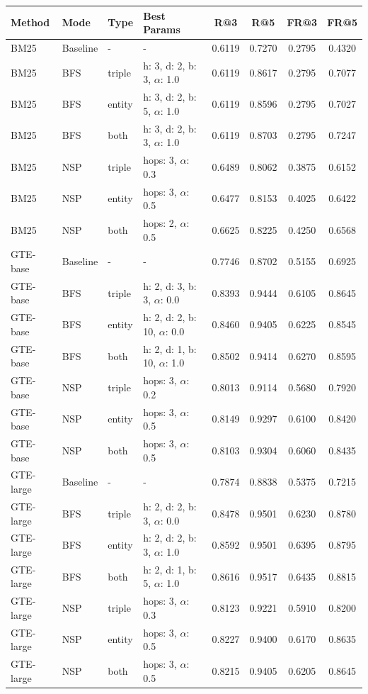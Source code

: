 \documentclass[11pt]{article}
\begin{document}
\begin{table}[t]
\centering
\footnotesize
\begin{tabular}{llllcccc}
\toprule
\textbf{Method} & \textbf{Mode} & \textbf{Type} & \textbf{Best Params} & \textbf{R@3} & \textbf{R@5} & \textbf{FR@3} & \textbf{FR@5} \\
\midrule

BM25 & Baseline & - & - & 0.6119 & 0.7270 & 0.2795 & 0.4320 \\
BM25 & BFS & triple & h: 3, d: 2, b: 3, $\alpha$: 1.0 & 0.6119 & 0.8617 & 0.2795 & 0.7077 \\
BM25 & BFS & entity & h: 3, d: 2, b: 5, $\alpha$: 1.0 & 0.6119 & 0.8596 & 0.2795 & 0.7027 \\
BM25 & BFS & both & h: 3, d: 2, b: 3, $\alpha$: 1.0 & 0.6119 & 0.8703 & 0.2795 & 0.7247 \\
BM25 & NSP & triple & hops: 3, $\alpha$: 0.3 & 0.6489 & 0.8062 & 0.3875 & 0.6152 \\
BM25 & NSP & entity & hops: 3, $\alpha$: 0.5 & 0.6477 & 0.8153 & 0.4025 & 0.6422 \\
BM25 & NSP & both & hops: 2, $\alpha$: 0.5 & 0.6625 & 0.8225 & 0.4250 & 0.6568 \\

GTE-base & Baseline & - & - & 0.7746 & 0.8702 & 0.5155 & 0.6925 \\
GTE-base & BFS & triple & h: 2, d: 3, b: 3, $\alpha$: 0.0 & 0.8393 & 0.9444 & 0.6105 & 0.8645 \\
GTE-base & BFS & entity & h: 2, d: 2, b: 10, $\alpha$: 0.0 & 0.8460 & 0.9405 & 0.6225 & 0.8545 \\
GTE-base & BFS & both & h: 2, d: 1, b: 10, $\alpha$: 1.0 & 0.8502 & 0.9414 & 0.6270 & 0.8595 \\
GTE-base & NSP & triple & hops: 3, $\alpha$: 0.2 & 0.8013 & 0.9114 & 0.5680 & 0.7920 \\
GTE-base & NSP & entity & hops: 3, $\alpha$: 0.5 & 0.8149 & 0.9297 & 0.6100 & 0.8420 \\
GTE-base & NSP & both & hops: 3, $\alpha$: 0.5 & 0.8103 & 0.9304 & 0.6060 & 0.8435 \\

GTE-large & Baseline & - & - & 0.7874 & 0.8838 & 0.5375 & 0.7215 \\
GTE-large & BFS & triple & h: 2, d: 2, b: 3, $\alpha$: 0.0 & 0.8478 & 0.9501 & 0.6230 & 0.8780 \\
GTE-large & BFS & entity & h: 2, d: 2, b: 3, $\alpha$: 1.0 & 0.8592 & 0.9501 & 0.6395 & 0.8795 \\
GTE-large & BFS & both & h: 2, d: 1, b: 5, $\alpha$: 1.0 & 0.8616 & 0.9517 & 0.6435 & 0.8815 \\
GTE-large & NSP & triple & hops: 3, $\alpha$: 0.3 & 0.8123 & 0.9221 & 0.5910 & 0.8200 \\
GTE-large & NSP & entity & hops: 3, $\alpha$: 0.5 & 0.8227 & 0.9400 & 0.6170 & 0.8635 \\
GTE-large & NSP & both & hops: 3, $\alpha$: 0.5 & 0.8215 & 0.9405 & 0.6205 & 0.8645 \\


\end{tabular}
\end{table}
\end{document}
